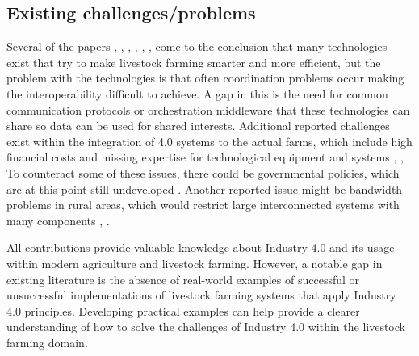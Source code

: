 \subsection{Existing challenges/problems}
Several of the papers \cite{pr7010036}, \cite{KRUIZE201612}, \cite{app122412844}, \cite{agronomy12030750}, \cite{s22124319}, \cite{9516818}, \cite{ZHANG2021127712} come to the conclusion that many technologies exist that try to make livestock farming smarter and more efficient, but the problem with the technologies is that often coordination problems occur making the interoperability difficult to achieve. A gap in this is the need for common communication protocols or orchestration middleware that these technologies can share so data can be used for shared interests.
Additional reported challenges exist within the integration of 4.0 systems to the actual farms, which include high financial costs and missing expertise for technological equipment and systems \cite{app122412844}, \cite{s22124319}, \cite{ZHANG2021127712}. To counteract some of these issues, there could be governmental policies, which are at this point still undeveloped \cite{pr7010036}.
Another reported issue might be bandwidth problems in rural areas, which would restrict large interconnected systems with many components \cite{pr7010036}, \cite{s22124319}.
\newline

All contributions provide valuable knowledge about Industry 4.0 and its usage within modern agriculture and livestock farming. However, a notable gap in existing literature is the absence of real-world examples of successful or unsuccessful implementations of livestock farming systems that apply Industry 4.0 principles. Developing practical examples can help provide a clearer understanding of how to solve the challenges of Industry 4.0 within the livestock farming domain.